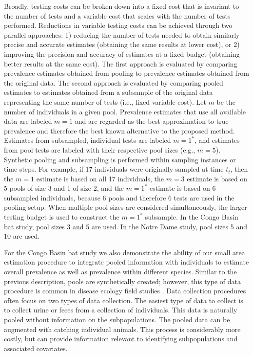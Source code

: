 \documentclass{article}
\begin{document}
Broadly, testing costs can be broken down into a fixed cost that is invariant to the number of tests and a variable cost that scales with the number of tests performed. Reductions in variable testing costs can be achieved through two parallel approaches: 1) reducing the number of tests needed to obtain similarly precise and accurate estimates (obtaining the same results at lower cost), or 2) improving the precision and accuracy of estimates at a fixed budget (obtaining better results at the same cost). The first approach is evaluated by comparing prevalence estimates obtained from pooling to prevalence estimates obtained from the original data. The second approach is evaluated by comparing pooled estimates to estimates obtained from a subsample of the original data representing the same number of tests (i.e., fixed variable cost). Let $m$ be the number of individuals in a given pool. Prevalence estimates that use all available data are labeled $m=1$ and are regarded as the best approximation to true prevalence and therefore the best known alternative to the proposed method. Estimates from subsampled, individual tests are labeled $m=1^*$, and estimates from pool tests are labeled with their respective pool sizes (e.g., $m=5$). Synthetic pooling and subsampling is performed within sampling instances or time steps. For example, if 17 individuals were originally sampled at time $t_i$, then the $m=1$ estimate is based on all 17 individuals, the $m=3$ estimate is based on 5 pools of size 3 and 1 of size 2, and the $m=1^*$ estimate is based on 6 subsampled individuals, because 6 pools and therefore 6 tests are used in the pooling setup. When multiple pool sizes are considered simultaneously, the larger testing budget is used to construct the $m=1^*$ subsample. In the Congo Basin bat study, pool sizes 3 and 5 are used. In the Notre Dame study, pool sizes 5 and 10 are used. 

For the Congo Basin bat study we also demonstrate the ability of our small area estimation procedure to integrate pooled information with individuals to estimate overall prevalence as well as prevalence within different species. Similar to the previous description, pools are synthetically created; however, this type of data procedure is common in disease ecology field studies . Data collection procedures often focus on two types of data collection. The easiest type of data to collect is to collect urine or feces from a collection of individuals. This data is naturally pooled without information on the subpopulations. The pooled data can be augmented with catching individual animals. This process is considerably more costly, but can provide information relevant to identifying subpopulations and associated covariates.
\end{document}

